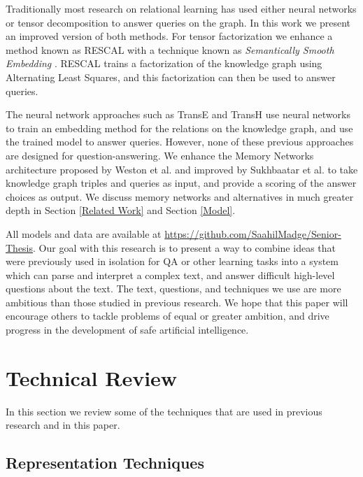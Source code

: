 \documentclass[pageno]{final_paper}
\begin{document}
Traditionally most research on relational learning has used either neural
networks or tensor decomposition to answer queries on the graph. In this work we
present an improved version of both methods. For tensor factorization we enhance
a method known as RESCAL \cite{Bader2007, Nickel2011} with a technique known as
\textit{Semantically Smooth Embedding} \cite{Guo2015}. RESCAL trains a
factorization of the knowledge graph using Alternating Least Squares, and this
factorization can then be used to answer queries.

The neural network approaches such as TransE \cite{Bordes2013} and TransH
\cite{Wang2014} use neural networks to train an embedding method for the
relations on the knowledge graph, and use the trained model to answer queries.
However, none of these previous approaches are designed for question-answering.
We enhance the Memory Networks architecture proposed by Weston et al.
\cite{Weston2015a} and improved by Sukhbaatar et al. \cite{Sukhbaatar2015} to
take knowledge graph triples and queries as input, and provide a scoring of the
answer choices as output. We discuss memory networks and alternatives in much
greater depth in Section \ref{Related Work} and Section \ref{Model}.

All models and data are available at
\url{https://github.com/SaahilMadge/Senior-Thesis}. Our goal with this research
is to present a way to combine ideas that were previously used in isolation for
QA or other learning tasks into a system which can parse and interpret a complex
text, and answer difficult high-level questions about the text. The text,
questions, and techniques we use are more ambitious than those studied in
previous research. We hope that this paper will encourage others to tackle
problems of equal or greater ambition, and drive progress in the development of
safe artificial intelligence.

\section{Technical Review}
\label{Technical Review}

In this section we review some of the techniques that are used in previous
research and in this paper.

\subsection{Representation Techniques}
\label{Representation Techniques}
\end{document}
